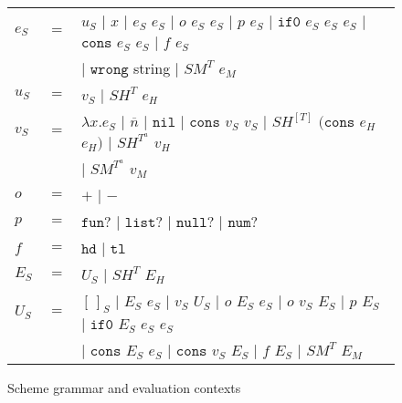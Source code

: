 \begin{figure}[p]
\centering
\begin{tabular}{lcl}
\vspace{5pt}

$e_{S}$ & $=$ & $u_{S}$ $\vert$ $x$ $\vert$ $e_{S}$ $e_{S}$ $\vert$ $o$ $e_{S}$ $e_{S}$ $\vert$ $p$ $e_{S}$ $\vert$ $\mathtt{if0}$ $e_{S}$ $e_{S}$ $e_{S}$ $\vert$ $\mathtt{cons}$ $e_{S}$ $e_{S}$ $\vert$ $f$ $e_{S}$ \\

\vspace{5pt}

&& $\vert$ $\mathtt{wrong}$ string $\vert$ $SM^{T}$ $e_{M}$ \\

\vspace{5pt}

$u_{S}$ & $=$ & $v_{S}$ $\vert$ $SH^{T}$ $e_{H}$ \\

\vspace{5pt}

$v_{S}$ & $=$ & $\lambda x.e_{S}$ $\vert$ $\overline{n}$ $\vert$ $\mathtt{nil}$ $\vert$ $\mathtt{cons}$ $v_{S}$ $v_{S}$ $\vert$ $SH^{[T]}$ $(\mathtt{cons}$ $e_{H}$ $e_{H})$ $\vert$ $SH^{T^{a}}$ $v_{H}$ \\

\vspace{5pt}

&& $\vert$ $SM^{T^{a}}$ $v_{M}$ \\

\vspace{5pt}

$o$ & $=$ & $+$ $\vert$ $-$ \\

\vspace{5pt}

$p$ & $=$ & $\mathtt{fun?}$ $\vert$ $\mathtt{list?}$ $\vert$ $\mathtt{null?}$ $\vert$ $\mathtt{num?}$ \\

\vspace{5pt}

$f$ & $=$ & $\mathtt{hd}$ $\vert$ $\mathtt{tl}$ \\

\vspace{5pt}

$E_{S}$ & $=$ & $U_{S}$ $\vert$ $SH^{T}$ $E_{H}$ \\

\vspace{5pt}

$U_{S}$ & $=$ & $[\,]_{S}$ $\vert$ $E_{S}$ $e_{S}$ $\vert$ $v_{S}$ $U_{S}$ $\vert$ $o$ $E_{S}$ $e_{S}$ $\vert$ $o$ $v_{S}$ $E_{S}$ $\vert$ $p$ $E_{S}$ $\vert$ $\mathtt{if0}$ $E_{S}$ $e_{S}$ $e_{S}$ \\

\vspace{5pt}

&& $\vert$ $\mathtt{cons}$ $E_{S}$ $e_{S}$ $\vert$ $\mathtt{cons}$ $v_{S}$ $E_{S}$ $\vert$ $f$ $E_{S}$ $\vert$ $SM^{T}$ $E_{M}$
\end{tabular}
\caption{Scheme grammar and evaluation contexts}
\label{sg}
\end{figure}